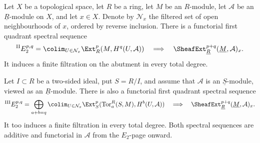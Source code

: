 \begin{lemma}
\label{lemma-constant-sheaf-ext-stalk-spectral-sequences}
\begin{reference}
\cite[Chapter IV, \S 4.3, Remark 2, p. 193]{Tohoku}
\end{reference}
Let $X$ be a topological space, let $R$ be a ring, let $M$ be an
$R$-module, let $\mathcal{A}$ be an $\underline{R}$-module on $X$, and let
$x \in X$. Denote by $\mathcal{N}_x$ the filtered set of open
neighbourhoods of $x$, ordered by reverse inclusion. There is a functorial
first quadrant spectral sequence
\begin{equation}
\label{equation-constant-sheaf-ext-stalk-first-spectral-sequence}
{}^{\mathrm{II}}E_2^{p, q} =
\colim_{U \in \mathcal{N}_x}
\Ext_R^p(M, H^q(U, \mathcal{A}))
\quad\Longrightarrow\quad
\SheafExt^{p + q}_{\underline{R}}(\underline{M}, \mathcal{A})_x.
\end{equation}
It induces a finite filtration on the abutment in every total degree.

Let $I \subset R$ be a two-sided ideal, put $S = R/I$, and assume that
$\mathcal{A}$ is an $\underline{S}$-module, viewed as an
$\underline{R}$-module. There is also a functorial first quadrant spectral
sequence
\begin{equation}
\label{equation-constant-sheaf-ext-stalk-quotient-spectral-sequence}
{}^{\mathrm{III}}E_2^{p, q} =
\bigoplus_{a + b = q}
\colim_{U \in \mathcal{N}_x}
\Ext_S^p(\text{Tor}_a^R(S, M), H^b(U, \mathcal{A}))
\quad\Longrightarrow\quad
\SheafExt^{p + q}_{\underline{R}}(\underline{M}, \mathcal{A})_x.
\end{equation}
It too induces a finite filtration in every total degree. Both spectral
sequences are additive and functorial in $\mathcal{A}$ from the $E_2$-page
onward.
\end{lemma}

